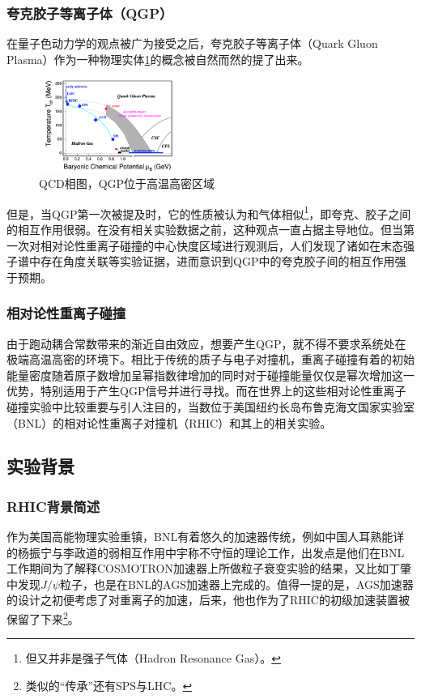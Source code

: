 \documentclass[%
 reprint,
 amsmath,amssymb,
 aps,
]{revtex4-1}
\begin{document}
\subsubsection{\label{sec:QGP}夸克胶子等离子体（QGP）}
在量子色动力学的观点被广为接受之后，夸克胶子等离子体（Quark Gluon Plasma）作为一种物理实体\ref{fig:QCD}的概念被自然而然的提了出来。
\begin{figure}[htbp]
    \includegraphics[width = 0.4\textwidth]{Plots/QCDPD.png}
    \caption{\label{fig:QCD}QCD相图，QGP位于高温高密区域}
\end{figure}
但是，当QGP第一次被提及时，它的性质被认为和气体相似\footnote{但又并非是强子气体（Hadron Resonance Gas）。}，即夸克、胶子之间的相互作用很弱。在没有相关实验数据之前，这种观点一直占据主导地位。但当第一次对相对论性重离子碰撞的中心快度区域进行观测后，人们发现了诸如在末态强子谱中存在角度关联等实验证据，进而意识到QGP中的夸克胶子间的相互作用强于预期\cite{Adams:2005dq}。
\subsubsection{\label{sec:HIC}相对论性重离子碰撞}
由于跑动耦合常数带来的渐近自由效应，想要产生QGP，就不得不要求系统处在极端高温高密的环境下。相比于传统的质子与电子对撞机，重离子碰撞有着的初始能量密度随着原子数增加呈幂指数律增加的同时对于碰撞能量仅仅是幂次增加这一优势，特别适用于产生QGP信号并进行寻找。而在世界上的这些相对论性重离子碰撞实验中比较重要与引人注目的，当数位于美国纽约长岛布鲁克海文国家实验室（BNL）的相对论性重离子对撞机（RHIC）和其上的相关实验\cite{Adams:2005dq}。
\subsection{\label{sec:ExpBG}实验背景}
\subsubsection{\label{sec:RHICBg}RHIC背景简述}
作为美国高能物理实验重镇，BNL有着悠久的加速器传统，例如中国人耳熟能详的杨振宁与李政道的弱相互作用中宇称不守恒的理论工作，出发点是他们在BNL工作期间为了解释COSMOTRON加速器上所做粒子衰变实验的结果，又比如丁肇中发现$J/\psi$粒子，也是在BNL的AGS加速器上完成的。值得一提的是，AGS加速器的设计之初便考虑了对重离子的加速，后来，他也作为了RHIC的初级加速装置被保留了下来\footnote{类似的“传承”还有SPS与LHC。}。
\end{document}
